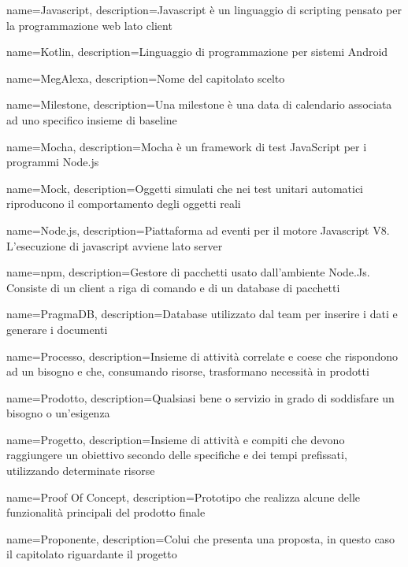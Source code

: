 {
	name={Javascript},
	description={Javascript è un linguaggio di scripting pensato per la programmazione web lato client}
	{\newpage}
}

{
	name={Kotlin},
	description={Linguaggio di programmazione per sistemi Android}
	{\newpage}
}

{
	name={MegAlexa},
	description={Nome del capitolato scelto}
}

{
	name={Milestone},
	description={Una milestone è una data di calendario associata ad uno specifico insieme di baseline}
}

{
	name={Mocha},
	description={Mocha è un framework di test JavaScript per i programmi Node.js}
}

{
	name={Mock},
	description={Oggetti simulati che nei test unitari automatici riproducono il comportamento degli oggetti reali}
	{\newpage}
}

{
	name={Node.js},
	description={Piattaforma ad eventi per il motore Javascript V8. L’esecuzione di javascript avviene lato server}
}

{
	name={npm},
	description={Gestore di pacchetti usato dall'ambiente Node.Js. Consiste di un client a riga di comando e di un database di pacchetti}
	{\newpage}
}

{
	name={PragmaDB},
	description={Database utilizzato dal team per inserire i dati e generare i documenti}
}

{
	name={Processo},
	description={Insieme di attività correlate e coese che rispondono ad un bisogno e che, consumando risorse, trasformano necessità in prodotti}
}

{
	name={Prodotto},
	description={Qualsiasi bene o servizio in grado di soddisfare un bisogno o un’esigenza}
}

{
	name={Progetto},
	description={Insieme di attività e compiti che devono raggiungere un obiettivo secondo delle specifiche e dei tempi prefissati, utilizzando determinate risorse}
}

{
	name={Proof Of Concept},
	description={Prototipo che realizza alcune delle funzionalità principali del prodotto finale}
}

{
	name={Proponente},
	description={Colui che presenta una proposta, in questo caso il capitolato riguardante il progetto}
	{\newpage}
}

